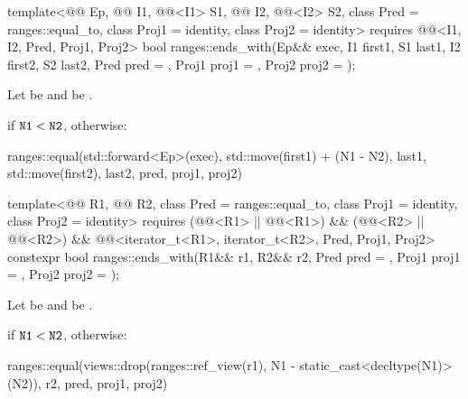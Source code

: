 \begin{itemdecl}
template<@@ Ep, @@ I1, @@<I1> S1,
         @@ I2, @@<I2> S2,
         class Pred = ranges::equal_to, class Proj1 = identity, class Proj2 = identity>
  requires @@<I1, I2, Pred, Proj1, Proj2>
  bool ranges::ends_with(Ep&& exec, I1 first1, S1 last1, I2 first2, S2 last2,
                         Pred pred = {}, Proj1 proj1 = {}, Proj2 proj2 = {});
\end{itemdecl}

\begin{itemdescr}
\pnum
Let  be  and
 be .

\pnum
\returns
{} if $\tcode{N1} < \tcode{N2}$, otherwise:
\begin{codeblock}
ranges::equal(std::forward<Ep>(exec), std::move(first1) + (N1 - N2), last1,
              std::move(first2), last2, pred, proj1, proj2)
\end{codeblock}
\end{itemdescr}

\begin{itemdecl}
template<@@ R1, @@ R2, class Pred = ranges::equal_to, class Proj1 = identity,
         class Proj2 = identity>
  requires (@@<R1> || @@<R1>) &&
           (@@<R2> || @@<R2>) &&
           @@<iterator_t<R1>, iterator_t<R2>, Pred, Proj1, Proj2>
  constexpr bool ranges::ends_with(R1&& r1, R2&& r2, Pred pred = {},
                                   Proj1 proj1 = {}, Proj2 proj2 = {});
\end{itemdecl}

\begin{itemdescr}
\pnum
Let  be  and
 be .

\pnum
\returns
{} if $\tcode{N1} < \tcode{N2}$, otherwise:
\begin{codeblock}
ranges::equal(views::drop(ranges::ref_view(r1), N1 - static_cast<decltype(N1)>(N2)),
              r2, pred, proj1, proj2)
\end{codeblock}
\end{itemdescr}

